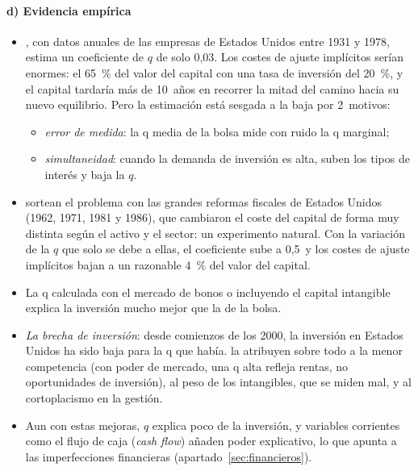 \documentclass[11pt]{article}
\begin{document}
\paragraph{d) Evidencia empírica}

\begin{itemize}
\item \textcite{Summers1981Taxation}, con datos anuales de las empresas de Estados Unidos entre 1931 y 1978, estima un coeficiente de $q$ de solo 0,03. Los costes de ajuste implícitos serían enormes: el 65~\% del valor del capital con una tasa de inversión del 20~\%, y el capital tardaría más de 10~años en recorrer la mitad del camino hacia su nuevo equilibrio. Pero la estimación está sesgada a la baja por 2~motivos\nocite{Romer2019Advanced}:
  \begin{itemize}
  \item \emph{error de medida}: la q media de la bolsa mide con ruido la q marginal;
  \item \emph{simultaneidad}: cuando la demanda de inversión es alta, suben los tipos de interés y baja la $q$.
  \end{itemize}
\item \textcite{CumminsHassettHubbard1994} sortean el problema con las grandes reformas fiscales de Estados Unidos (1962, 1971, 1981 y 1986), que cambiaron el coste del capital de forma muy distinta según el activo y el sector: un experimento natural. Con la variación de la $q$ que solo se debe a ellas, el coeficiente sube a 0,5~y los costes de ajuste implícitos bajan a un razonable 4~\% del valor del capital\nocite{Romer2019Advanced}.
\item La q calculada con el mercado de bonos\nocite{Philippon2009Bond} o incluyendo el capital intangible\nocite{PetersTaylor2017Intangible} explica la inversión mucho mejor que la de la bolsa.
\item \emph{La brecha de inversión}: desde comienzos de los 2000, la inversión en Estados Unidos ha sido baja para la q que había. \textcite{GutierrezPhilippon2017Investmentless} la atribuyen sobre todo a la menor competencia (con poder de mercado, una q alta refleja rentas, no oportunidades de inversión), al peso de los intangibles, que se miden mal, y al cortoplacismo en la gestión.
\item Aun con estas mejoras, $q$ explica poco de la inversión, y variables corrientes como el flujo de caja (\emph{cash flow}) añaden poder explicativo, lo que apunta a las imperfecciones financieras (apartado~\ref{sec:financieros}).
\end{itemize}
\end{document}
